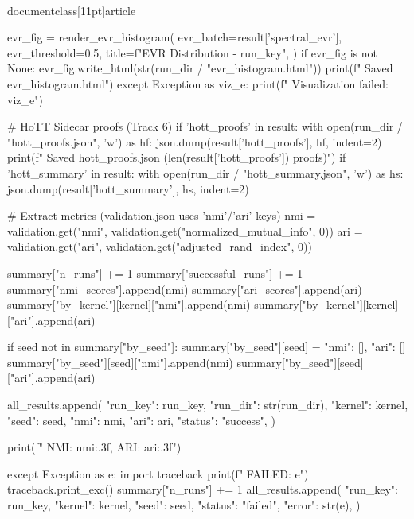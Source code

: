 \\documentclass[11pt]{article}
\begin{document}
\begin{CodeBlock}
                        evr_fig = render_evr_histogram(
                            evr_batch=result['spectral_evr'],
                            evr_threshold=0.5,
                            title=f"EVR Distribution - {run_key}",
                        )
                        if evr_fig is not None:
                            evr_fig.write_html(str(run_dir / "evr_histogram.html"))
                            print(f"    Saved evr_histogram.html")
                    except Exception as viz_e:
                        print(f"    Visualization failed: {viz_e}")

                # HoTT Sidecar proofs (Track 6)
                if 'hott_proofs' in result:
                    with open(run_dir / "hott_proofs.json", 'w') as hf:
                        json.dump(result['hott_proofs'], hf, indent=2)
                    print(f"    Saved hott_proofs.json ({len(result['hott_proofs'])} proofs)")
                if 'hott_summary' in result:
                    with open(run_dir / "hott_summary.json", 'w') as hs:
                        json.dump(result['hott_summary'], hs, indent=2)

                # Extract metrics (validation.json uses 'nmi'/'ari' keys)
                nmi = validation.get("nmi", validation.get("normalized_mutual_info", 0))
                ari = validation.get("ari", validation.get("adjusted_rand_index", 0))

                summary["n_runs"] += 1
                summary["successful_runs"] += 1
                summary["nmi_scores"].append(nmi)
                summary["ari_scores"].append(ari)
                summary["by_kernel"][kernel]["nmi"].append(nmi)
                summary["by_kernel"][kernel]["ari"].append(ari)

                if seed not in summary["by_seed"]:
                    summary["by_seed"][seed] = {"nmi": [], "ari": []}
                summary["by_seed"][seed]["nmi"].append(nmi)
                summary["by_seed"][seed]["ari"].append(ari)

                all_results.append({
                    "run_key": run_key,
                    "run_dir": str(run_dir),
                    "kernel": kernel,
                    "seed": seed,
                    "nmi": nmi,
                    "ari": ari,
                    "status": "success",
                })

                print(f"    NMI: {nmi:.3f}, ARI: {ari:.3f}")

            except Exception as e:
                import traceback
                print(f"    FAILED: {e}")
                traceback.print_exc()
                summary["n_runs"] += 1
                all_results.append({
                    "run_key": run_key,
                    "kernel": kernel,
                    "seed": seed,
                    "status": "failed",
                    "error": str(e),
                })


\end{CodeBlock}
\end{document}

